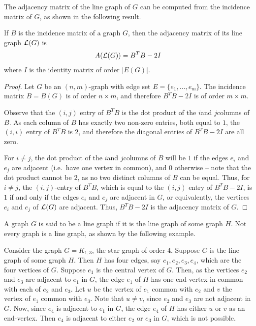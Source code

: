 The adjacency matrix of the line graph of $G$ can be computed from the incidence matrix of $G$, as shown in the following result.

\begin{Theorem}
	If $B$ is the incidence matrix of a graph $G$, then the adjacency matrix of its line graph $\operatorname{\mathcal L}(G)$ is
	\begin{equation*}
		A\pqty{\LG(G)} = B^T B - 2I
	\end{equation*}
	where $I$ is the identity matrix of order $|E(G)|$.
\end{Theorem}

\begin{proof}
	Let $G$ be an $(n, m)$-graph with edge set $E = \{e_1, \ldots, e_m\}$. The incidence matrix $B = B(G)$ is of order $n \times m$, and therefore $B^T B - 2I$ is of order $m \times m$.
	
	Observe that the $(i, j)$ entry of $B^T B$ is the dot product of the $i$\nth and $j$\nth columns of $B$. As each column of $B$ has exactly two non-zero entries, both equal to $1$, the $(i, i)$ entry of $B^T B$ is $2$, and therefore the diagonal entries of $B^T B - 2I$ are all zero.
	
	For $i \ne j$, the dot product of the $i$\nth and $j$\nth columns of $B$ will be $1$ if the edges $e_i$ and $e_j$ are adjacent (i.e.\ have one vertex in common), and $0$ otherwise -- note that the dot product cannot be $2$, as no two distinct columns of $B$ can be equal. Thus, for $i \ne j$, the $(i, j)$-entry of $B^T B$, which is equal to the $(i, j)$ entry of $B^T B - 2I$, is $1$ if and only if the edges $e_i$ and $e_j$ are adjacent in $G$, or equivalently, the vertices $e_i$ and $e_j$ of $\operatorname{\mathcal L}(G)$ are adjacent. Thus, $B^T B - 2I$ is the adjacency matrix of $G$.
\end{proof}

A graph $G$ is said to be a line graph if it is the line graph of some graph $H$. Not every graph is a line graph, as shown by the following example.

\begin{Example}
Consider the graph $G = K_{1, 3}$, the star graph of order $4$. Suppose $G$ is the line graph of some graph $H$. Then $H$ has four edges, say $e_1, e_2, e_3, e_4$, which are the four vertices of $G$. Suppose $e_1$ is the central vertex of $G$. Then, as the vertices $e_2$ and $e_3$ are adjacent to $e_1$ in $G$, the edge $e_1$ of $H$ has one end-vertex in common with each of $e_2$ and $e_3$. Let $u$ be the vertex of $e_1$ common with $e_2$ and $v$ the vertex of $e_1$ common with $e_3$. Note that $u \ne v$, since $e_2$ and $e_3$ are not adjacent in $G$. Now, since $e_4$ is adjacent to $e_1$ in $G$, the edge $e_4$ of $H$ has either $u$ or $v$ as an end-vertex. Then $e_4$ is adjacent to either $e_2$ or $e_3$ in $G$, which is not possible.
\end{Example}


